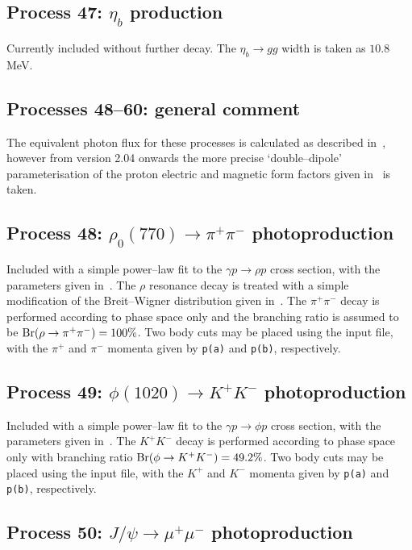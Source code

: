 \documentclass[12pt]{article}
\begin{document}
\subsection{Process 47: $\eta_b$ production}

Currently included without further decay. The $\eta_b \to gg$ width is taken as $10.8$ MeV.

\subsection{Processes 48--60: general comment}

The equivalent photon flux for these processes is calculated as described in~\cite{Harland-Lang:2015cta}, however from version 2.04 onwards the more precise `double--dipole' parameterisation of the proton electric and magnetic form factors given in~\cite{Bernauer:2013tpr} is taken.

\subsection{Process 48: $\rho_0(770)\to \pi^+\pi^-$ photoproduction}

Included with a simple power--law fit to the $\gamma p\to \rho p$ cross section, with the parameters given in~\cite{Harland-Lang:2015cta}. The $\rho$ resonance decay is treated with a simple modification of the Breit--Wigner distribution given in~\cite{Leupold:1997dg}. The $\pi^+\pi^-$ decay is performed according to phase space only and the branching ratio is assumed to be ${\rm Br}(\rho \to \pi^+\pi^-)=100\%$. Two body cuts may be placed using the input file, with the $\pi^+$ and $\pi^-$  momenta given by \texttt{p(a)} and \texttt{p(b)}, respectively.

\subsection{Process 49: $\phi(1020)\to K^+K^-$ photoproduction}

Included with a simple power--law fit to the $\gamma p\to \phi p$ cross section, with the parameters given in~\cite{Harland-Lang:2015cta}. The $K^+K^-$ decay is performed according to phase space only with branching ratio ${\rm Br}(\phi \to K^+K^-)=49.2\%$. Two body cuts may be placed using the input file, with the $K^+$ and $K^-$  momenta given by \texttt{p(a)} and \texttt{p(b)}, respectively.


\subsection{Process 50: $J/\psi\to \mu^+\mu^-$ photoproduction}
\end{document}
